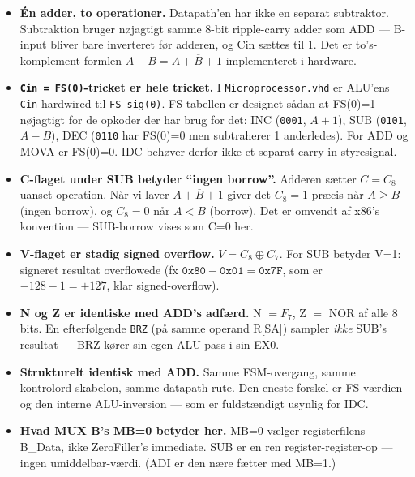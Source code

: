 \documentclass[11pt,a4paper]{article}
\begin{document}
\begin{itemize}
  \item \textbf{Én adder, to operationer.} Datapath'en har ikke en separat subtraktor.
        Subtraktion bruger nøjagtigt samme 8-bit ripple-carry adder som ADD --- B-input bliver bare
        inverteret før adderen, og Cin sættes til 1. Det er to's-komplement-formlen
        $A - B = A + \overline{B} + 1$ implementeret i hardware.

  \item \textbf{\texttt{Cin = FS(0)}-tricket er hele tricket.} I \texttt{Microprocessor.vhd} er
        ALU'ens \texttt{Cin} hardwired til \texttt{FS\_sig(0)}. FS-tabellen er designet sådan at
        FS(0)=1 nøjagtigt for de opkoder der har brug for det:
        INC (\texttt{0001}, $A+1$), SUB (\texttt{0101}, $A-B$), DEC (\texttt{0110} har FS(0)=0 men subtraherer 1 anderledes).
        For ADD og MOVA er FS(0)=0. IDC behøver derfor ikke et separat carry-in styresignal.

  \item \textbf{C-flaget under SUB betyder ``ingen borrow''.}
        Adderen sætter $C = C_8$ uanset operation. Når vi laver $A + \overline{B} + 1$
        giver det $C_8 = 1$ præcis når $A \geq B$ (ingen borrow), og $C_8 = 0$ når $A < B$ (borrow).
        Det er omvendt af x86's konvention --- SUB-borrow vises som C=0 her.

  \item \textbf{V-flaget er stadig signed overflow.} $V = C_8 \oplus C_7$.
        For SUB betyder V=1: signeret resultat overflowede (fx $\texttt{0x80} - \texttt{0x01} = \texttt{0x7F}$,
        som er $-128 - 1 = +127$, klar signed-overflow).

  \item \textbf{N og Z er identiske med ADD's adfærd.} N $= F_7$, Z $=$ NOR af alle 8 bits.
        En efterfølgende \texttt{BRZ} (på samme operand R[SA]) sampler \emph{ikke} SUB's resultat ---
        BRZ kører sin egen ALU-pass i sin EX0.

  \item \textbf{Strukturelt identisk med ADD.} Samme FSM-overgang, samme kontrolord-skabelon,
        samme datapath-rute. Den eneste forskel er FS-værdien og den interne ALU-inversion ---
        som er fuldstændigt usynlig for IDC.

  \item \textbf{Hvad MUX B's MB=0 betyder her.} MB=0 vælger registerfilens B\_Data, ikke ZeroFiller's
        immediate. SUB er en ren register-register-op --- ingen umiddelbar-værdi. (ADI er den nære fætter
        med MB=1.)
\end{itemize}
\end{document}

